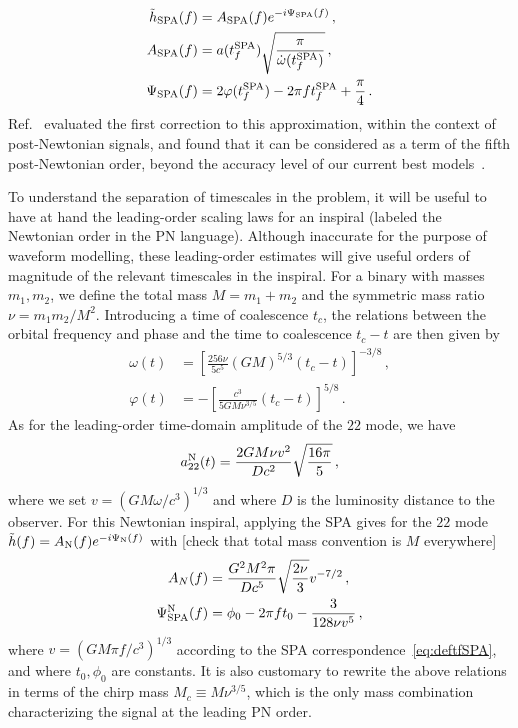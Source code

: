 \documentclass[aps,showpacs,twocolumn,
prd,superscriptaddress,nofootinbib]{revtex4-1}
\newcommand{\be}{\begin{equation}}
\newcommand{\ee}{\end{equation}}
\newcommand{\Mchirp}{M_{c}}
\newcommand{\tfSPA}{t_{f}^{\rm SPA}}
\newcommand{\SM}[1]{{\color{Red} #1}}
\begin{document}
\begin{subequations}
\begin{align}
	\tilde{h}_{\rm SPA}(f) &= A_{\rm SPA}(f) e^{-i\Psi_{\rm SPA}(f)} \,, \\
	A_{\rm SPA}(f) &= a(\tfSPA) \sqrt{\frac{\pi}{\dot{\omega}(\tfSPA)}} \,, \label{eq:ASPA} \\
	\Psi_{\rm SPA}(f) &= 2\varphi(\tfSPA) - 2\pi f \tfSPA + \frac{\pi}{4} \,. \label{eq:PsiSPA}
\end{align}
\end{subequations}
Ref.~\cite{Droz+99} evaluated the first correction to this approximation, within the context of post-Newtonian signals, and found that it can be considered as a term of the fifth post-Newtonian order, beyond the accuracy level of our current best models~\cite{BlanchetLiving}.

To understand the separation of timescales in the problem, it will be useful to have at hand the leading-order scaling laws for an inspiral (labeled the Newtonian order in the PN language). Although inaccurate for the purpose of waveform modelling, these leading-order estimates will give useful orders of magnitude of the relevant timescales in the inspiral. For a binary with masses $m_{1}, m_{2}$, we define the total mass $M=m_{1}+m_{2}$ and the symmetric mass ratio $\nu = m_{1}m_{2}/M^{2}$. Introducing a time of coalescence $t_{c}$, the relations between the orbital frequency and phase and the time to coalescence $t_{c} - t$ are then given by
\begin{subequations}\label{eq:omegaphiN}
\begin{align}
	\omega(t) &= \left[ \frac{256\nu}{5c^{5}} (GM)^{5/3} (t_{c}-t) \right]^{-3/8} \,, \\
	\varphi(t) &= -\left[ \frac{c^{3}}{5 G M \nu^{3/5}} (t_{c}-t) \right]^{5/8} \,.
\end{align}
\end{subequations}
As for the leading-order time-domain amplitude of the $22$ mode, we have~\cite{BlanchetLiving}
\be\label{eq:a22N}
	a_{22}^{\rm N} (t) = \frac{2 G M \nu v^{2}}{D c^{2}} \sqrt{\frac{16 \pi}{5}} \,,
\ee
where we set $v = (G M\omega/c^{3})^{1/3}$ and where $D$ is the luminosity distance to the observer. For this Newtonian inspiral, applying the SPA gives for the $22$ mode $\tilde{h}(f) = A_{\rm N}(f)e^{-i\Psi_{\rm N}(f)}$ with \SM{[check that total mass convention is $M$ everywhere]}
\begin{subequations}\label{eq:SPAN}
\begin{align}
	A_{N}(f) &= \frac{G^{2}M^{2} \pi}{Dc^{5}} \sqrt{\frac{2\nu}{3}} v^{-7/2}\,, \label{eq:ASPAN}\\
	\Psi_{\rm SPA}^{\rm N}(f) &= \phi_{0} - 2\pi f t_{0} - \frac{3}{128\nu v^{5}} \,, \label{eq:PsiSPAN} 
\end{align}
\end{subequations}
where $v=(G M \pi f/c^{3})^{1/3}$ according to the SPA correspondence~\eqref{eq:deftfSPA}, and where $t_{0}, \phi_{0}$ are constants. It is also customary to rewrite the above relations in terms of the chirp mass $\Mchirp \equiv M\nu^{3/5}$, which is the only mass combination characterizing the signal at the leading PN order.
\end{document}
